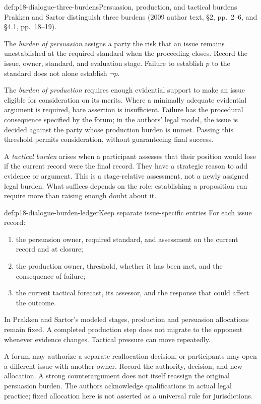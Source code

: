 \begin{hbdefinition}{def:p18-dialogue-three-burdens}{Persuasion, production, and tactical burdens}
Prakken and Sartor distinguish three burdens (2009 author text,
\S2, pp.~2--6, and \S4.1, pp.~18--19).

The \emph{burden of persuasion} assigns a party the risk that an issue
remains unestablished at the required standard when the proceeding
closes. Record the issue, owner, standard, and evaluation stage.
Failure to establish \(p\) to the standard does not alone establish
\(\neg p\).

The \emph{burden of production} requires enough evidential support
to make an issue eligible for consideration on its merits.
Where a minimally adequate evidential argument is required, bare
assertion is insufficient. Failure has the procedural consequence
specified by the forum; in the authors' legal model, the issue is
decided against the party whose production burden is unmet.
Passing this threshold permits consideration, without guaranteeing
final success.

A \emph{tactical burden} arises when a participant assesses that their
position would lose if the current record were the final record.
They have a strategic reason to add evidence or argument.
This is a stage-relative assessment, not a newly assigned legal burden.
What suffices depends on the role: establishing a proposition can
require more than raising enough doubt about it.
\end{hbdefinition}

\begin{hbmethod}{def:p18-dialogue-burden-ledger}{Keep separate issue-specific entries}
For each issue record:
\begin{enumerate}
\item the persuasion owner, required standard, and assessment on the
current record and at closure;
\item the production owner, threshold, whether it has been met, and
the consequence of failure;
\item the current tactical forecast, its assessor, and the response
that could affect the outcome.
\end{enumerate}
In Prakken and Sartor's modeled stages, production and persuasion
allocations remain fixed. A completed production step does not migrate
to the opponent whenever evidence changes. Tactical pressure can
move repeatedly.

A forum may authorize a separate reallocation decision, or participants
may open a different issue with another owner. Record the authority,
decision, and new allocation. A strong counterargument does not itself
reassign the original persuasion burden. The authors acknowledge
qualifications in actual legal practice; fixed allocation here is
not asserted as a universal rule for jurisdictions.
\end{hbmethod}

